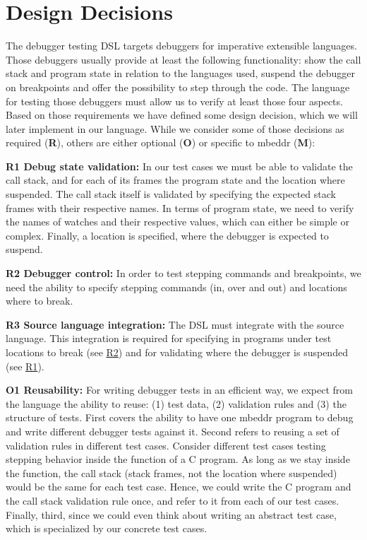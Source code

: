 \section{Design Decisions}

The debugger testing \ac{DSL} targets debuggers for imperative extensible
languages.
Those debuggers usually provide at least the following functionality:
show the call stack and program state in relation to the languages used, 
suspend the debugger on breakpoints and offer the possibility to 
step through the code. The language for testing those debuggers must allow us to
verify at least those four aspects. 
Based on those requirements we have defined
some design decision, which we will later implement in our language. While we consider 
some of those decisions as required (\textbf{R}), others are either optional
(\textbf{O}) or specific to mbeddr (\textbf{M}):


\textbf{\label{R1}R1 Debug state validation:} In our test cases we
must be able to validate the call stack, and for each of its frames 
the program state and the location where suspended. 
The call stack itself is validated by specifying the expected stack
frames with their respective names. In terms of program state, we need to verify
the names of watches and their respective values, which can either be simple
or complex. 
Finally, a location is specified, where the debugger is expected to suspend.

\textbf{\label{R2}R2 Debugger control:} In order to test stepping
commands and breakpoints, we need the ability to specify stepping commands
(in, over and out) and locations where to break.

\textbf{\label{R3}R3 Source language integration:} The
\ac{DSL} must integrate with the source language.
This integration is required for specifying in programs under test
locations to break (see \hyperref[R2]{R2}) and for validating where the debugger is suspended
(see \hyperref[R1]{R1}).

\textbf{\label{O1}O1 Reusability:} For writing debugger tests in
an efficient way, we expect from the language the ability to reuse: (1) test
data, (2) validation rules and (3) the structure of tests. First covers the ability to
have one mbeddr program to debug and write different debugger tests against
it. Second refers to reusing a set of validation rules in different test cases.
Consider different test cases testing stepping behavior inside the  
function of a C program.
As long as we stay inside the function, the call stack (stack frames, not the
location where suspended) would be the same for each test case. Hence, we could
write the C program and the call stack validation rule once, and refer to it
from each of our test cases. Finally, third, since we could even think about
writing an abstract test case, which is specialized by our concrete test cases.

